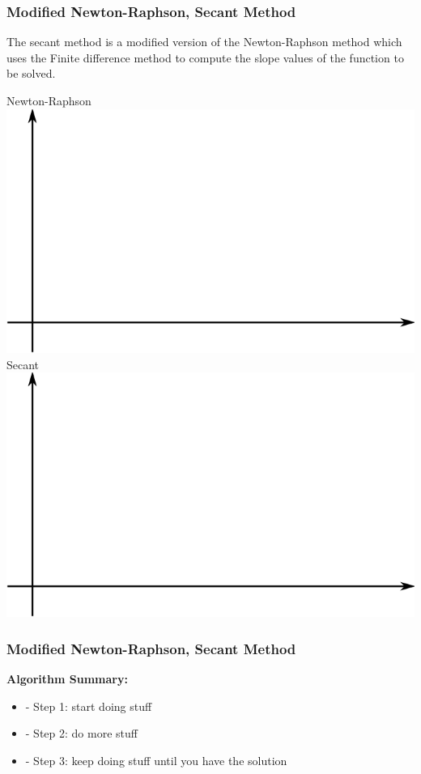 \documentclass[fleqn]{beamer} %
\newcommand{\sectionIIsubsectionVtitle}{Modified Newton-Raphson, Secant Method}
\begin{document}
			\begin{frame}
				\frametitle{\sectionIIsubsectionVtitle}
				\bigskip

				The {\PR secant} method is a modified version of the Newton-Raphson method which uses the Finite difference method to compute the slope values of the function to be solved. \\

				\begin{multicols}{2}
				Newton-Raphson
				\includegraphics[scale=.22]{images/lecture4_fig1.png} 
				Secant
				\includegraphics[scale=.22]{images/lecture4_fig1.png}
				\end{multicols}

			
				\btVFill 
			\end{frame}

			\begin{frame}
				\frametitle{\sectionIIsubsectionVtitle}
				\bigskip

				\textbf{Algorithm Summary:}
				\begin{itemize}
					\item - Step 1: start doing stuff 
					\item - Step 2: do more stuff
					\item - Step 3: keep doing stuff until you have the solution
				\end{itemize}
				\btVFill 
			\end{frame}
\end{document}
